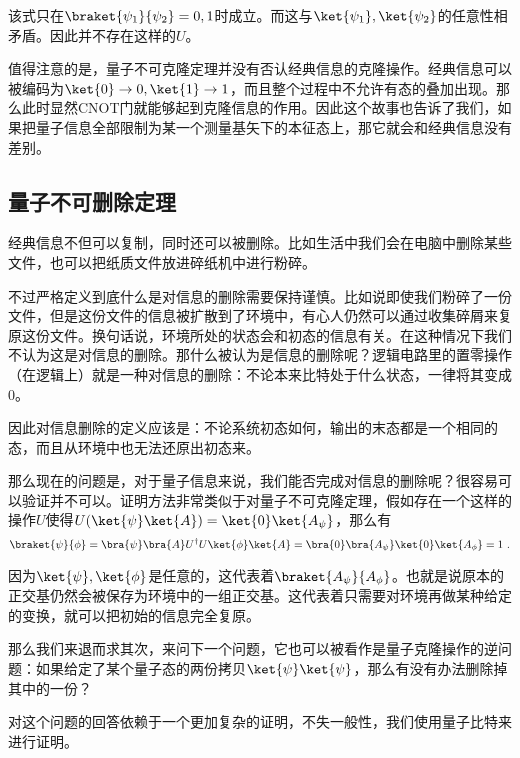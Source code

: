 该式只在$\braket{\psi_1}{\psi_2}=0,1$时成立。而这与$\ket{\psi_1},\ket{\psi_2}$的任意性相矛盾。因此并不存在这样的$U$。

值得注意的是，量子不可克隆定理并没有否认经典信息的克隆操作。经典信息可以被编码为$\ket{0}\to0,\ket{1}\to1$，而且整个过程中不允许有态的叠加出现。那么此时显然CNOT门就能够起到克隆信息的作用。因此这个故事也告诉了我们，如果把量子信息全部限制为某一个测量基矢下的本征态上，那它就会和经典信息没有差别。

\subsection{量子不可删除定理}

经典信息不但可以复制，同时还可以被删除。比如生活中我们会在电脑中删除某些文件，也可以把纸质文件放进碎纸机中进行粉碎。

不过严格定义到底什么是对信息的删除需要保持谨慎。比如说即使我们粉碎了一份文件，但是这份文件的信息被扩散到了环境中，有心人仍然可以通过收集碎屑来复原这份文件。换句话说，环境所处的状态会和初态的信息有关。在这种情况下我们不认为这是对信息的删除。那什么被认为是信息的删除呢？逻辑电路里的置零操作（在逻辑上）就是一种对信息的删除：不论本来比特处于什么状态，一律将其变成0。

因此对信息删除的定义应该是：不论系统初态如何，输出的末态都是一个相同的态，而且从环境中也无法还原出初态来。

那么现在的问题是，对于量子信息来说，我们能否完成对信息的删除呢？很容易可以验证并不可以。证明方法非常类似于对量子不可克隆定理，假如存在一个这样的操作$U$使得$U(\ket{\psi}\ket{A})=\ket{0}\ket{A_\psi}$，那么有
\begin{equation}
\braket{\psi}{\phi}=\bra{\psi}\bra{A}U^\dagger U\ket{\phi}\ket{A}=\bra{0}\bra{A_\psi}\ket{0}\ket{A_\phi}=1~.
\end{equation}

因为$\ket{\psi},\ket{\phi}$是任意的，这代表着$\braket{A_\psi}{A_\phi}$。也就是说原本的正交基仍然会被保存为环境中的一组正交基。这代表着只需要对环境再做某种给定的变换，就可以把初始的信息完全复原。

那么我们来退而求其次，来问下一个问题，它也可以被看作是量子克隆操作的逆问题：如果给定了某个量子态的两份拷贝$\ket{\psi}\ket{\psi}$，那么有没有办法删除掉其中的一份？

对这个问题的回答依赖于一个更加复杂的证明，不失一般性，我们使用量子比特来进行证明。